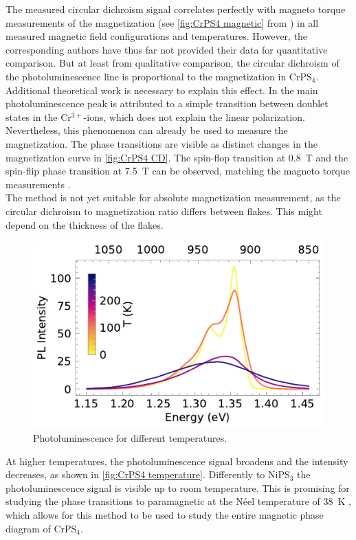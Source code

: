 \documentclass[
	oneside,
	parskip=half,
	a4paper,
]{scrbook}
\begin{document}
The measured circular dichroism signal correlates perfectly with magneto torque measurements of the magnetization (see \autoref{fig:CrPS4 magnetic} from \cite{CrPS4_magnetic}) in all measured magnetic field configurations and temperatures.
However, the corresponding authors have thus far not provided their data for quantitative comparison.
But at least from qualitative comparison, the circular dichroism of the photoluminescence line is proportional to the magnetization in CrPS$_4$.\\
Additional theoretical work is necessary to explain this effect.
In \cite{CrPS4_pl} the main photoluminescence peak is attributed to a simple transition between doublet states in the Cr$^{3+}$-ions, which does not explain the linear polarization.\\
Nevertheless, this phenomenon can already be used to measure the magnetization.
The phase transitions are visible as distinct changes in the magnetization curve in \autoref{fig:CrPS4 CD}.
The spin-flop transition at \SI{.8}{T} and the spin-flip phase transition at \SI{7.5}{T} can be observed, matching the magneto torque measurements \cite{CrPS4_magnetic}.\\
The method is not yet suitable for absolute magnetization measurement, as the circular dichroism to magnetization ratio differs between flakes.
This might depend on the thickness of the flakes.


\begin{figure}
	\centering
	\includegraphics{../figures/2024-04-22 CrPS4 temperature series.pdf}
	\caption{Photoluminescence for different temperatures.}
	\label{fig:CrPS4 temperature}
\end{figure}
At higher temperatures, the photoluminescence signal broadens and the intensity decreases, as shown in \autoref{fig:CrPS4 temperature}.
Differently to NiPS$_3$ the photoluminescence signal is visible up to room temperature.
This is promising for studying the phase transitions to paramagnetic at the Néel temperature of \SI{38}{K} \cite{CrPS4_magnetic},
which allows for this method to be used to study the entire magnetic phase diagram of CrPS$_4$.
\end{document}
